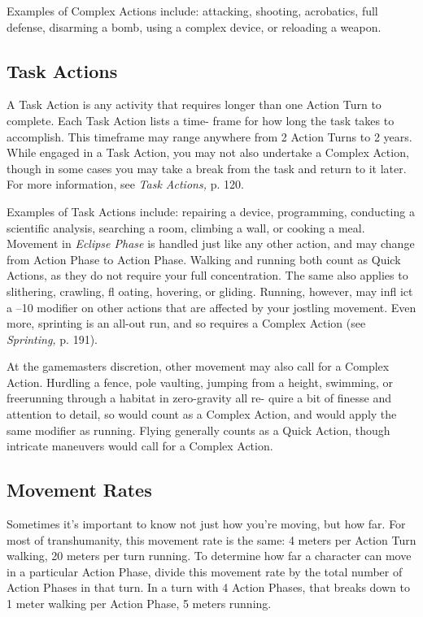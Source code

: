 Examples of Complex Actions include: attacking, 
shooting, acrobatics, full defense, disarming a bomb, 
using a complex device, or reloading a weapon.

\subsection{Task Actions}

A Task Action is any activity that requires longer than one 
Action Turn to complete. Each Task Action lists a time-
frame for how long the task takes to accomplish. This 
timeframe may range anywhere from 2 Action Turns to 2 
years. While engaged in a Task Action, you may not also 
undertake a Complex Action, though in some cases you 
may take a break from the task and return to it later. For 
more information, see \textit{Task Actions,} p. 120.

Examples of Task Actions include: repairing a 
device, programming, conducting a scientific analysis, 
searching a room, climbing a wall, or cooking a meal.
Movement in \textit{Eclipse Phase} is handled just like any 
other action, and may change from Action Phase to 
Action Phase. Walking and running both count as Quick 
Actions, as they do not require your full concentration. 
The same also applies to slithering, crawling, fl oating, 
hovering, or gliding. Running, however, may infl ict a 
–10 modifier on other actions that are affected by your 
jostling movement. Even more, sprinting is an all-out run, 
and so requires a Complex Action (see \textit{Sprinting,} p. 191).

At the gamemasters discretion, other movement 
may also call for a Complex Action. Hurdling a fence, 
pole vaulting, jumping from a height, swimming, or 
freerunning through a habitat in zero-gravity all re-
quire a bit of finesse and attention to detail, so would 
count as a Complex Action, and would apply the 
same modifier as running. Flying generally counts as a 
Quick Action, though intricate maneuvers would call 
for a Complex Action.

\subsection{Movement Rates}

Sometimes it's important to know not just how you're 
moving, but how far. For most of transhumanity, this 
movement rate is the same: 4 meters per Action Turn 
walking, 20 meters per turn running. To determine 
how far a character can move in a particular Action 
Phase, divide this movement rate by the total number 
of Action Phases in that turn. In a turn with 4 Action 
Phases, that breaks down to 1 meter walking per 
Action Phase, 5 meters running. 

